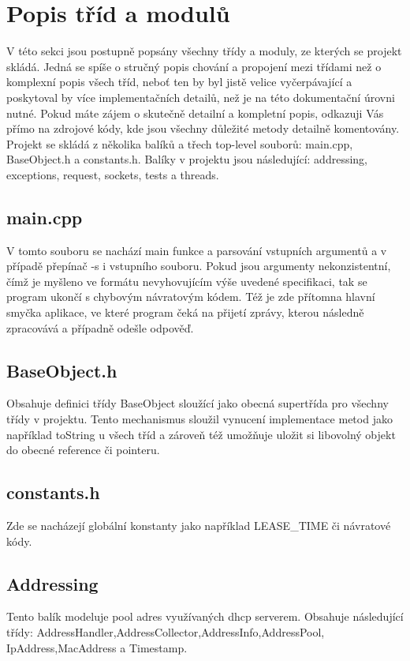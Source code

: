 \documentclass[12pt,a4paper]{report}
\begin{document}
\chapter{Popis tříd a modulů}
V této sekci jsou postupně popsány všechny třídy a moduly, ze kterých se projekt skládá.  Jedná se spíše o stručný popis chování a propojení mezi třídami než o komplexní popis všech tříd, neboť ten by byl jistě velice vyčerpávající a poskytoval by více implementačních detailů, než je na této dokumentační úrovni nutné. Pokud máte zájem o skutečně detailní a kompletní popis, odkazuji Vás přímo na zdrojové kódy, kde jsou všechny důležité metody detailně komentovány. 
Projekt se skládá z několika balíků a třech top-level  souborů: main.cpp, BaseObject.h a constants.h.
Balíky v projektu jsou následující: addressing, exceptions, request, sockets, tests a threads. 
\section*{main.cpp}
V tomto souboru se nachází main funkce a parsování vstupních argumentů a v případě přepínač -s i vstupního souboru. Pokud jsou argumenty nekonzistentní, čímž je myšleno ve formátu nevyhovujícím výše uvedené specifikaci, tak se program ukončí s chybovým návratovým kódem. Též je zde přítomna hlavní smyčka aplikace, ve které program čeká na přijetí zprávy, kterou následně zpracovává a případně odešle odpověď.
\section*{BaseObject.h}
Obsahuje definici třídy BaseObject sloužící jako obecná supertřída pro všechny třídy v projektu. Tento mechanismus sloužil vynucení implementace metod jako například toString u všech tříd a zároveň též umožňuje uložit si libovolný objekt do obecné reference či pointeru.
\section*{constants.h}
Zde se nacházejí globální konstanty jako například LEASE\_TIME či návratové kódy.
\section*{Addressing}
Tento balík modeluje pool adres využívaných dhcp serverem. Obsahuje následující třídy: AddressHandler,AddressCollector,AddressInfo,AddressPool,\\IpAddress,MacAddress a Timestamp.
\end{document}
